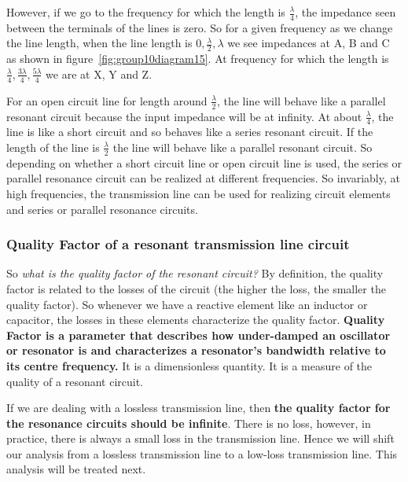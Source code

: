 However, if we go to the frequency for which the length is $ \frac{\lambda}{4} $, the impedance seen between the terminals of the lines is zero. So for a given frequency as we change the line length, when the line
length is $0, \frac{\lambda}{2}, \lambda $ we see impedances at A, B and C as shown in figure~\ref{fig:group10diagram15}. At frequency for which the length is $ \frac{\lambda}{4}, \frac{3\lambda}{4}, \frac{5\lambda}{4}$ we are at X, Y and Z.

For an open circuit line for length around $ \frac{\lambda}{2} $, the line will behave like a parallel resonant circuit because the input impedance will be at infinity. At about $ \frac{\lambda}{4} $, the line is like a short circuit and so behaves like a series resonant circuit. If the length of the line is $ \frac{\lambda}{2} $ the line will behave like a parallel resonant circuit.
So depending on whether a short circuit line or open circuit line is used, the series or parallel resonance circuit can be realized at different frequencies. So invariably, at high frequencies, the transmission line can be used for realizing circuit elements and series or parallel resonance circuits.

\subsubsection{Quality Factor of a resonant transmission line circuit}
So \emph{what is the quality factor of the resonant circuit?} By definition, the quality factor is related to the losses of the circuit (the higher the loss, the smaller the quality factor). So whenever we have a reactive element like an inductor or capacitor, the losses in these elements characterize the quality factor. \textbf{Quality Factor is a parameter that describes how under-damped an oscillator or resonator is and characterizes a resonator's bandwidth relative to its centre frequency.} It is a dimensionless quantity. It is a measure of the quality of a resonant circuit. 

If we are dealing with a lossless transmission line, then \textbf{the quality factor for the resonance circuits should be infinite}. There is no loss, however, in practice, there is always a small loss in the transmission line. Hence we will shift our analysis from a lossless transmission line to a low-loss transmission line. This analysis will be treated next.



